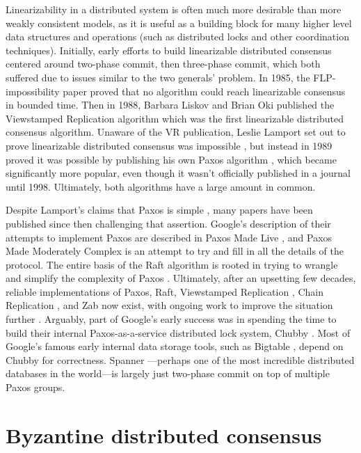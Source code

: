 \documentclass[8pt,fleqn,openany]{book}
\begin{document}
Linearizability in a distributed system is often much more desirable than more
weakly consistent models, as it is
useful as a building block for many higher level data structures and operations
(such as distributed locks and other coordination techniques). Initially, early
efforts to build linearizable distributed consensus centered around two-phase
commit, then three-phase commit, which both
suffered due to issues similar to the two generals' problem. In 1985,
the FLP-impossibility paper \cite{flp} proved that no algorithm
could reach linearizable consensus in bounded time. Then in 1988, Barbara Liskov
and Brian Oki published the Viewstamped Replication algorithm \cite{vr} which
was the first linearizable distributed consensus algorithm. Unaware of the VR
publication, Leslie Lamport set out to prove linearizable distributed consensus
was impossible \cite{paxos-note}, but instead in 1989 proved it was possible by
publishing his own Paxos algorithm \cite{paxos}, which became
significantly more popular, even though it wasn't officially published in a
journal until 1998. Ultimately, both algorithms have a large amount in
common.

Despite Lamport's claims that Paxos is simple \cite{paxos-simple},
many papers have been published since then
challenging that assertion. Google's description of their attempts to implement
Paxos are described in Paxos Made Live \cite{paxos-live},
and Paxos Made Moderately
Complex \cite{paxos-complex} is an attempt to try and fill in all the details of
the protocol. The entire basis of the Raft algorithm is rooted in trying to
wrangle and simplify the complexity of Paxos \cite{raft}. Ultimately, after an
upsetting few decades, reliable implementations of Paxos, Raft, Viewstamped
Replication \cite{vrr}, Chain Replication \cite{chain-rep}, and Zab \cite{zab}
now exist, with ongoing work to improve the situation
further \cite{epaxos,paxos-flexible}. Arguably, part of Google's early success
was in spending the time to build their internal Paxos-as-a-service distributed
lock system, Chubby \cite{chubby}. Most of Google's famous early internal data
storage tools, such as Bigtable \cite{bigtable}, depend on Chubby for
correctness. Spanner \cite{spanner}---perhaps one of the most incredible
distributed databases in the world---is largely just two-phase commit on top of
multiple Paxos groups.

\section{Byzantine distributed consensus}
\end{document}
